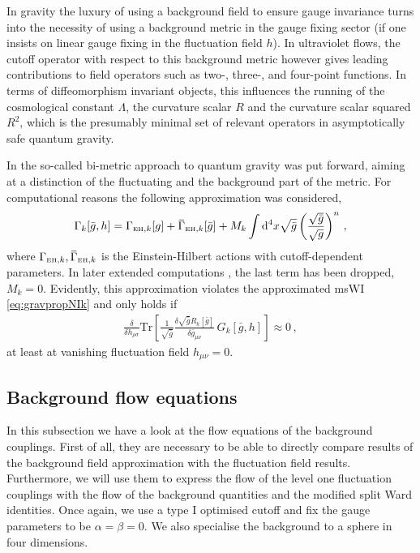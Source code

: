 \documentclass[11pt]{book}
\newcommand{\overbar}[1]{\mkern 1.5mu\overline{\mkern-1.5mu#1\mkern-1.5mu}\mkern 1.5mu}
\newcommand{\Tr}{\mathrm{Tr}}
\numberwithin{equation}{chapter}
\begin{document}
In gravity the luxury of using a background field to ensure gauge invariance
turns into the necessity of using a background metric in the gauge fixing sector
(if one insists on linear gauge fixing in the fluctuation field $h$).
In ultraviolet flows, the cutoff operator with respect to this background
metric however gives leading contributions to field operators such as two-, three-,
and four-point functions.
In terms of diffeomorphism invariant objects, this influences
the running of the cosmological constant $\Lambda$,
the curvature scalar $R$ and the curvature scalar squared $R^2$,
which is the presumably minimal set of relevant operators in
asymptotically safe quantum gravity.

In \cite{Manrique:2010am} the so-called bi-metric approach to quantum
gravity was put forward, aiming at a distinction of the fluctuating
and the background part of the metric. For computational reasons the
following approximation was considered,
\begin{align}
  \Gamma_k[\bar g,h] = \Gamma_{\mathrm{\scriptscriptstyle{EH}},k} [g]
  + \overbar           \Gamma_{\mathrm{\scriptscriptstyle{EH}},k} [\bar g]
  + M_k \int \mathrm d^4x \sqrt{\bar g}
  \left(
    \frac{\sqrt{\bar g}}{\sqrt{g}}
  \right)^n
  \,,
\end{align}
where
$\Gamma_{\mathrm{\scriptscriptstyle{EH}},k},\overbar \Gamma_{\mathrm{\scriptscriptstyle{EH}},k}$
is the Einstein-Hilbert actions with cutoff-dependent parameters.
In later extended computations \cite{Becker:2014qya}, the last term has been
dropped, $M_k=0$. Evidently, this approximation violates the approximated msWI
\eqref{eq:gravpropNIk} and only holds if
\begin{align}
	\frac{\delta}{\delta h_{\rho\sigma}} \Tr\left[\frac 1{\sqrt{\bar g}}\frac{\delta \sqrt{\bar g} R_k[\bar g]}{\delta \bar
	g_{\mu\nu}}\, G_k[\bar g, h]\right]\approx 0\,,
\end{align}
at least at vanishing fluctuation field $h_{\mu\nu} = 0$.


\subsection{Background flow equations}

In this subsection we have a look at the flow equations of the background couplings.
First of all, they are necessary to be able to directly compare
results of the background field approximation with the fluctuation field results.
Furthermore, we will use them to express the flow of the level one fluctuation couplings
with the flow of the background quantities and the modified split Ward identities.
Once again, we use a type I optimised cutoff and fix the gauge parameters to be
$\alpha=\beta=0$.
We also specialise the background to a sphere in four dimensions.
\end{document}
